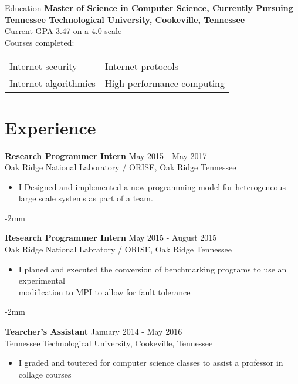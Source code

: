 \documentclass[10pt]{res}
\newcommand{\job}[5]{
    {\bf #1} \hfill #2 \\
    #3 #4
#5
}
\begin{document}
\begin{resume}
\begin{section}{Education}
    {\bf Master of Science in Computer Science, Currently Pursuing\\
    Tennessee Technological University, Cookeville, Tennessee} \\
    Current GPA 3.47 on a 4.0 scale \\
    Courses completed:

    \vspace{-0.15in}
    \begin{tabularx}{\textwidth}{l l}
        Internet security & Internet protocols \\
        Internet algorithmics & High performance computing \\
    \end{tabularx}
\end{section}

\section{Experience}
\job{Research Programmer Intern} {May 2015 - May 2017} {Oak Ridge National Laboratory / ORISE, Oak Ridge Tennessee}
{
\begin{itemize} \itemsep -2pt  %
         \item {I Designed and implemented a new programming model for 
             heterogeneous large scale systems as part of a team.}
\end{itemize}
}
\vspace{-2mm}
\job{Research Programmer Intern} {May 2015 - August 2015}
{Oak Ridge National Labratory / ORISE, Oak Ridge Tennessee}
{
\begin{itemize} \itemsep -2pt  %
         \item {I planed and executed the conversion of benchmarking 
             programs to use an experimental\\ 
             modification to MPI to allow for fault tolerance}
\end{itemize}
}

\vspace{-2mm}
\job{Tearcher's Assistant} {January 2014 - May 2016}
{Tennessee Technological University, Cookeville, Tennessee}
{
\begin{itemize} \itemsep -2pt  %
         \item {I graded and toutered for computer science classes to assist a 
                professor in collage courses}
\end{itemize}
}


\end{resume}
\end{document}
